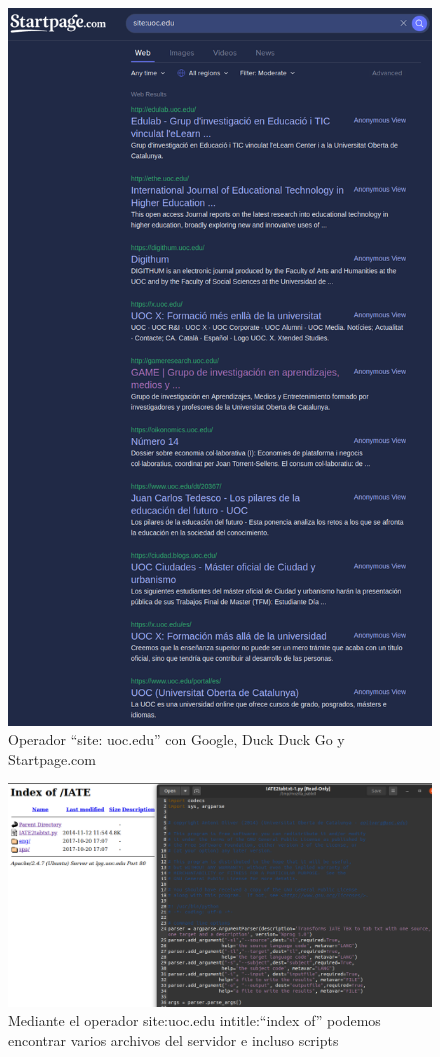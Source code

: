 \documentclass[10pt,a4paper]{article}
\begin{document}
\begin{figure}[ht!]
  \includegraphics[scale=0.2]{startpage.png}
  \caption{Operador ``site: uoc.edu'' con Google, Duck Duck Go y Startpage.com}
  \label{fig:otg-info-001-1}
\end{figure}

\pagebreak

\begin{figure}[ht!]
\centering
  \includegraphics[scale=0.2]{dorks.png}
  \caption{Mediante el operador site:uoc.edu intitle:``index of'' podemos encontrar varios archivos del servidor e incluso scripts}
  \label{fig:otg-info-001-2}
\end{figure}
\end{document}
